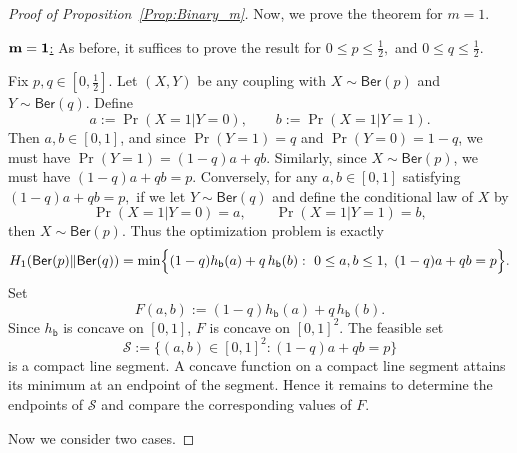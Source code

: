 \documentclass[journal]{IEEEtran}
\newcommand{\1}{\mathbf{1}}
\newcommand{\Ber}{\mathsf{Ber}}
\begin{document}
\begin{proof}[Proof of Proposition~\ref{Prop:Binary_m}]
Now, we prove the theorem for $m=1$.

\noindent\underline{$\bf m= 1$:} 
As before, it suffices to prove the result for \(0\le p\le \tfrac12,\) and \(0\le q\le \tfrac12.\) 



Fix $p,q\in[0,\frac12]$. Let $(X,Y)$ be any coupling with
\(X\sim \Ber(p)\) and \(Y\sim \Ber(q).\) Define
\[a:=\Pr(X=1| Y=0),
\qquad b:=\Pr(X=1| Y=1).\]
Then $a,b\in[0,1]$, and since $\Pr(Y=1)=q$ and $\Pr(Y=0)=1-q$, we must have \(\Pr(Y=1)=(1-q)a+qb.\) Similarly, since $X\sim \Ber(p)$, we must have \((1-q)a+qb=p.\)
Conversely, for any $a,b\in[0,1]$ satisfying
\((1-q)a+qb=p,\) if we let $Y\sim \Ber(q)$ and define the conditional law of $X$ by
\[\Pr(X=1| Y=0)=a,\qquad \Pr(X=1| Y=1)=b,\] then $X\sim \Ber(p)$.
Thus the optimization problem is exactly
\[H_1(\Ber(p)\|\Ber(q))
= \min\Bigl\{(1-q)h_{\mathsf{b}}(a)+q\,h_{\mathsf{b}}(b):\ 0\le a,b\le 1,\ (1-q)a+qb=p\Bigr\}.\]
Set
\[F(a,b):=(1-q)h_{\mathsf{b}}(a)+q\,h_{\mathsf{b}}(b).\]
Since $h_{\mathsf{b}}$ is concave on $[0,1]$, $F$ is concave on $[0,1]^2$. The feasible set
\[\mathcal S:=\{(a,b)\in[0,1]^2:(1-q)a+qb=p\}\]
is a compact line segment. A concave function on a compact line segment attains its minimum at an endpoint of the segment. Hence it remains to determine the endpoints of $\mathcal S$ and compare the corresponding values of $F$.

Now we consider two cases. 

\end{proof}
\end{document}
